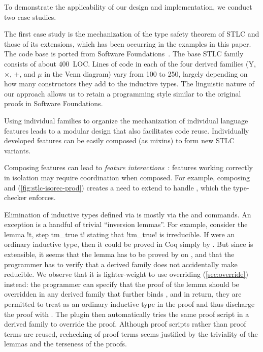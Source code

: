 
To demonstrate the applicability of our design and implementation, we
conduct two case studies.



The first case study is the mechanization of the type safety theorem of
STLC and those of its extensions,
which has been occurring in the examples in this paper.
The code base is ported from Software Foundations~\cite{sf-pl}.
%
The base STLC family consists of about 400~LOC.
Lines of code in each of the four derived families
($\mathrm{Y}$, $\times$, $+$, and $\mu$ in the Venn diagram)
vary from 100 to 250, largely depending on how many constructors they
add to the inductive types.
%
The linguistic nature of our approach allows us to retain a programming
style similar to the original proofs in Software Foundations.



Using individual families to organize the mechanization of individual
language features leads to a modular design that also facilitates code reuse.
%
Individually developed features can be easily composed (as mixins) to
form new STLC variants.

Composing features can lead to \emph{feature interactions}~\cite{batory2011feature}:
features working correctly in isolation may require coordination when composed.
For example, composing  and 
(\cref{fig:stlc-isorec-prod}) creates a need to extend  to
handle , which the type-checker enforces.

Elimination of inductive types defined via  is
mostly via the  and  commands.
An exception is a handful of trivial ``inversion lemmas''.
For example, consider the lemma \lsti!\forall t, \neg step tm_true t!
stating that \lsti!tm_true! is irreducible.
If  were an ordinary inductive type, then it could be proved in Coq
simply by .
But since  is extensible, it seems that the lemma has to be
proved by  on , and that the programmer
has to verify that a derived family does not accidentally make  reducible.
%
We observe that it is lighter-weight to use overriding (\cref{sec:override}) instead:
the programmer can specify that the proof of the lemma should be overridden
in any derived family that further binds ,
and in return, they are permitted to treat  as an ordinary
inductive type in the proof and thus discharge the proof with .
The plugin then automatically tries the same proof script in a derived
family to override the proof. Although proof scripts rather
than proof terms are reused, rechecking of proof terms seems justified
by the triviality of the lemmas and the terseness of the proofs.

